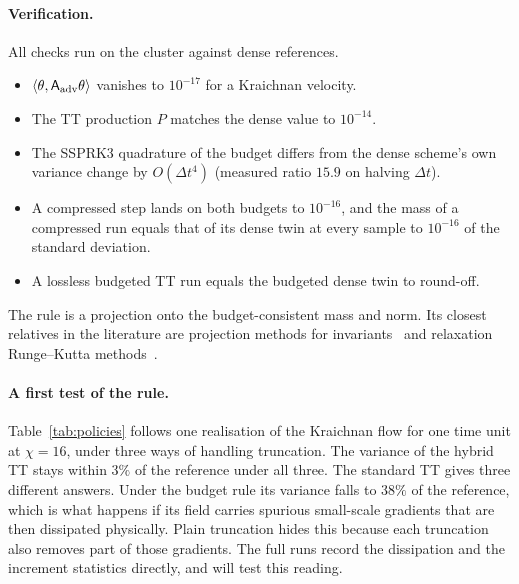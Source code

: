 \documentclass[aps,prfluids,reprint,onecolumn,amsmath,amssymb,nofootinbib,floatfix]{revtex4-2}
\begin{document}
\paragraph{Verification.} All checks run on the cluster against dense
references.
\begin{itemize}
\item $\langle\theta,\mathsf{A}_{\rm adv}\theta\rangle$ vanishes to $10^{-17}$ for
      a Kraichnan velocity.
\item The TT production $P$ matches the dense value to $10^{-14}$.
\item The SSPRK3 quadrature of the budget differs from the dense scheme's own
      variance change by $O(\Delta t^4)$ (measured ratio $15.9$ on halving
      $\Delta t$).
\item A compressed step lands on both budgets to $10^{-16}$, and the mass of
      a compressed run equals that of its dense twin at every sample to
      $10^{-16}$ of the standard deviation.
\item A lossless budgeted TT run equals the budgeted dense twin to round-off.
\end{itemize}
The rule is a projection onto the budget-consistent mass and norm. Its closest relatives
in the literature are projection methods for invariants~\cite{HLW2006} and
relaxation Runge--Kutta methods~\cite{Ketcheson2019}.

\paragraph{A first test of the rule.} Table~\ref{tab:policies} follows one
realisation of the Kraichnan flow for one time unit at $\chi=16$, under three ways
of handling truncation. The variance of the hybrid TT stays within $3\%$ of the
reference under all three. The standard TT gives three different answers. Under the budget rule its variance
falls to $38\%$ of the reference, which is what happens if its field carries
spurious small-scale gradients that are then dissipated physically. Plain
truncation hides this because each truncation also removes part of those
gradients. The full runs record the dissipation and the increment statistics
directly, and will test this reading.
\end{document}
